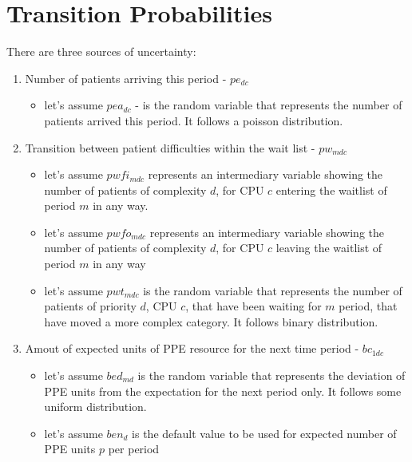\documentclass{article}
\begin{document}
\section{Transition Probabilities}
There are three sources of uncertainty: 
\begin{enumerate}
    	
	\item Number of patients arriving this period - $pe_{dc}$
		\begin{itemize}
			\item let's assume $pea_{dc}$ - is the random variable that represents the number of patients arrived this period. It follows a poisson distribution.
		\end{itemize}
	
	\item Transition between patient difficulties within the wait list - $pw_{mdc}$
		\begin{itemize}
			\item let's assume $pwfi_{mdc}$ represents an intermediary variable showing the number of patients of complexity $d$, for CPU $c$ entering the waitlist of period $m$ in any way.
			\item let's assume $pwfo_{mdc}$ represents an intermediary variable showing the number of patients of complexity $d$, for CPU $c$ leaving the waitlist of period $m$  in any way
			\item let's assume $pwt_{mdc}$ is the random variable that represents the number of patients of priority $d$, CPU $c$, that have been waiting for $m$ period, that have moved a more complex category. It follows binary distribution.
		\end{itemize}

	\item Amout of expected units of PPE resource for the next time period - $bc_{1dc}$
		\begin{itemize}
			\item let's assume $bed_{md}$ is the random variable that represents the deviation of PPE units from the expectation for the next period only. It follows some uniform distribution.
			\item let's assume $ben_{d}$ is the default value to be used for expected number of PPE units $p$ per period
		\end{itemize}
\end{enumerate}
\end{document}
